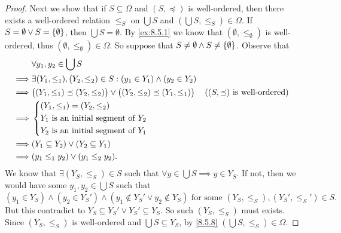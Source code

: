 \begin{proof}
  Next we show that if \(S \subseteq \Omega\) and \((S, \preceq)\) is well-ordered, then there exists a well-ordered relation \(\leq_S\) on \(\bigcup S\) and \((\bigcup S, \leq_S) \in \Omega\).
  If \(S = \emptyset \lor S = \left\lbrace\emptyset\right\rbrace\), then \(\bigcup S = \emptyset\).
  By \cref{ex:8.5.1} we know that \((\emptyset, \leq_{\emptyset})\) is well-ordered, thus \((\emptyset, \leq_{\emptyset}) \in \Omega\).
  So suppose that \(S \neq \emptyset \land S \neq \left\lbrace\emptyset\right\rbrace\).
  Observe that
  \begin{align*}
             & \forall y_1, y_2 \in \bigcup S                                                                                                                  \\
    \implies & \exists (Y_1, \leq_1), (Y_2, \leq_2) \in S : (y_1 \in Y_1) \land (y_2 \in Y_2)                                                                  \\
    \implies & \big((Y_1, \leq_1) \preceq (Y_2, \leq_2)\big) \lor \big((Y_2, \leq_2) \preceq (Y_1, \leq_1)\big) &  & \text{(\((S, \preceq)\) is well-ordered)} \\
    \implies & \begin{dcases}
                 (Y_1, \leq_1) = (Y_2, \leq_2)             \\
                 Y_1 \text{ is an initial segment of } Y_2 \\
                 Y_2 \text{ is an initial segment of } Y_1
               \end{dcases}                                                                                                       \\
    \implies & (Y_1 \subseteq Y_2) \lor (Y_2 \subseteq Y_1)                                                                                                    \\
    \implies & (y_1 \leq_1 y_2) \lor (y_1 \leq_2 y_2).
  \end{align*}
  We know that \(\exists (Y_S, \leq_S) \in S\) such that \(\forall y \in \bigcup S \implies y \in Y_S\).
  If not, then we would have some \(y_1, y_2 \in \bigcup S\) such that
  \[
    (y_1 \in Y_S) \land (y_2 \in Y_S') \land (y_1 \notin Y_S' \lor y_2 \notin Y_S) \text{ for some } (Y_S, \leq_S), (Y_S', \leq_S') \in S.
  \]
  But this contradict to \(Y_S \subseteq Y_S' \lor Y_S' \subseteq Y_S\).
  So such \((Y_S, \leq_S)\) must exists.
  Since \((Y_S, \leq_S)\) is well-ordered and \(\bigcup S \subseteq Y_S\), by \cref{8.5.8} \((\bigcup S, \leq_S) \in \Omega\).


\end{proof}
